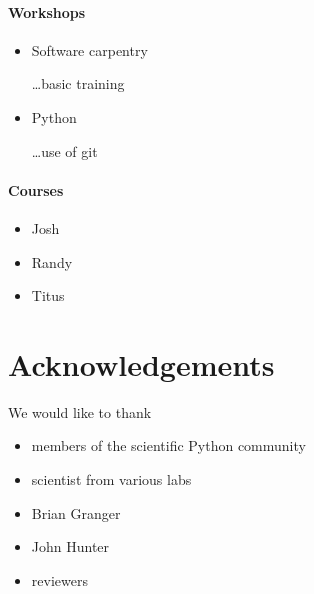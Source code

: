\documentclass[ChapterTOCs,krantz2]{krantz} %
\begin{document}
\paragraph{ {\bf Workshops}}

\begin{itemize}

\item Software carpentry

\ldots basic training

\item Python

\ldots use of git

\end{itemize}

\paragraph{ {\bf Courses}}

\begin{itemize}

\item Josh

\item Randy

\item Titus

\end{itemize}


\section*{Acknowledgements}
We would like to thank
\begin{itemize}
\item members of the scientific Python community
\item scientist from various labs
\item Brian Granger
\item John Hunter
\item reviewers
\end{itemize}



\end{document}
